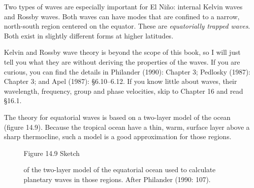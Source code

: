 Two types of waves are especially important for El Ni\~{n}o: internal
Kelvin waves and Rossby
waves. Both waves can have modes that are confined to a narrow,
north-south region centered on the equator. These are
\textit{equatorially trapped waves}. Both exist in slightly different forms at higher
latitudes.

Kelvin and Rossby wave theory is beyond the scope
of this book, so I will just tell you what they are without deriving
the properties of the waves. If you are curious, you can find the
details in Philander (1990): Chapter 3; Pedlosky (1987): Chapter 3;
and Apel (1987): \S6.10--6.12. If you know little about waves, their
wavelength, frequency, group and phase velocities, skip to Chapter 16
and read \S16.1.

The theory for equatorial waves is based on a two-layer model of the
ocean (figure 14.9). Because the tropical ocean have a thin, warm,
surface layer above a sharp thermocline,
such a model is a good approximation for those regions.

\begin{figure}[t!]
\centering
{}
\footnotesize
Figure 14.9 Sketch \rule{0pt}{4ex}of the two-layer model of the
equatorial ocean used to calculate planetary waves in those
regions. After Philander (1990: 107).
\label{fig:modelsketch}
\end{figure}

